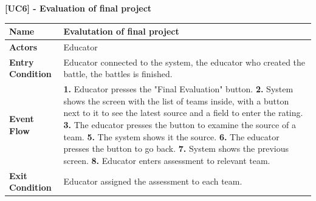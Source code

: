 \raggedright
\textbf{[UC6] - Evaluation of final project}
\begin{table}[h]
\begin{tabular}{|l|p{12cm}|} \hline 

\rule[-3mm]{0mm}{1cm}
\textbf{Name} & Evalutation of final project \\ \hline 

\rule[-3mm]{0mm}{1cm}
\textbf{Actors} & Educator \\ \hline 

\rule[-3mm]{0mm}{1cm}
\textbf{Entry Condition} & Educator connected to the system, the educator who created the battle, the battles is finished.  
\vspace{2pt}
\\ \hline 

\rule[-3mm]{0mm}{1cm}
\textbf{Event Flow} & 
\textbf{1.} Educator presses the "Final Evaluation" button.
\vspace{4pt}
\newline
\textbf{2.} System shows the screen with the list of teams inside, with a button next to it to see the latest source and a field to enter the rating.
\vspace{4pt}
\newline
\textbf{3.} The educator presses the button to examine the source of a team.
\vspace{4pt}
\newline
\textbf{5.} The system shows it the source.
\vspace{4pt}
\newline
\textbf{6.} The educator presses the button to go back.
\vspace{4pt}
\newline
\textbf{7.} System shows the previous screen.
\vspace{4pt}
\newline
\textbf{8.} Educator enters assessment to relevant team.

\\ \hline 

\rule[-3mm]{0mm}{1cm}
\textbf{Exit Condition} & Educator  assigned the assessment to each team. \\ \hline

\end{tabular}
\end{table}

